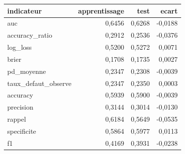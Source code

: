 \begin{tabular}{lrrr}
\toprule
\textbf{indicateur} & \textbf{apprentissage} & \textbf{test} & \textbf{ecart} \\
\midrule
auc & 0,6456 & 0,6268 & -0,0188 \\
accuracy\_ratio & 0,2912 & 0,2536 & -0,0376 \\
log\_loss & 0,5200 & 0,5272 & 0,0071 \\
brier & 0,1708 & 0,1735 & 0,0027 \\
pd\_moyenne & 0,2347 & 0,2308 & -0,0039 \\
taux\_defaut\_observe & 0,2347 & 0,2350 & 0,0003 \\
accuracy & 0,5939 & 0,5900 & -0,0039 \\
precision & 0,3144 & 0,3014 & -0,0130 \\
rappel & 0,6184 & 0,5649 & -0,0535 \\
specificite & 0,5864 & 0,5977 & 0,0113 \\
f1 & 0,4169 & 0,3931 & -0,0238 \\
\bottomrule
\end{tabular}

